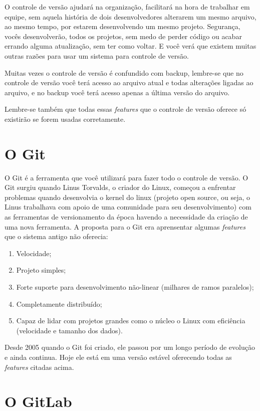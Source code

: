 \documentclass[12pt,openright,oneside,a4paper,english,brazil]{abntex2}
\begin{document}
O controle de versão ajudará na organização, facilitará na hora de trabalhar em equipe, sem aquela história de dois desenvolvedores alterarem um mesmo arquivo, ao mesmo tempo, por estarem desenvolvendo um mesmo projeto. Segurança, vocês desenvolverão, todos os projetos, sem medo de perder código ou acabar errando alguma atualização, sem ter como voltar. E você verá que existem muitas outras razões para usar um sistema para controle de versão.

Muitas vezes o controle de versão é confundido com backup, lembre-se que no controle de versão você terá acesso ao arquivo atual e todas alterações ligadas ao arquivo, e no backup você terá acesso apenas a última versão do arquivo.

Lembre-se também que todas essas \textit{features} que o controle de versão oferece só existirão se forem usadas corretamente.

\section{O Git}

O Git é a ferramenta que você utilizará para fazer todo o controle de versão. O Git surgiu quando Linus Torvalds, o criador do Linux, começou a enfrentar problemas quando desenvolvia o kernel do linux (projeto open source, ou seja, o Linus trabalhava com apoio de uma comunidade para seu desenvolvimento) com as ferramentas de versionamento da época havendo a necessidade da criação de uma nova ferramenta. A proposta para o Git era aprensentar algumas \textit{features} que o sistema antigo não oferecia:

\begin{enumerate}
	\item Velocidade;
	\item Projeto simples;
	\item Forte suporte para desenvolvimento não-linear (milhares de ramos paralelos);
	\item Completamente distribuído;
	\item Capaz de lidar com projetos grandes como o núcleo o Linux com eficiência (velocidade e tamanho dos dados).	
\end{enumerate}

Desde 2005 quando o Git foi criado, ele passou por um longo período de evolução e ainda continua. Hoje ele está em uma versão estável oferecendo todas as \textit{features} citadas acima.

\section{O GitLab \label{gitlab}}
\end{document}
